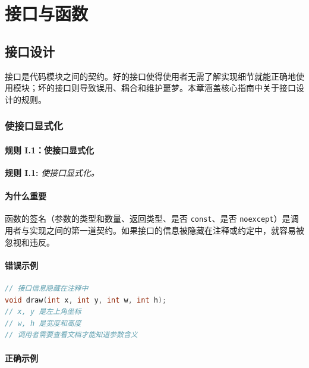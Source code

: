 
\part{接口与函数}

\chapter{接口设计}

接口是代码模块之间的契约。好的接口使得使用者无需了解实现细节就能正确地使用模块；坏的接口则导致误用、耦合和维护噩梦。本章涵盖核心指南中关于接口设计的规则。

\section{使接口显式化}

\subsection{规则 I.1：使接口显式化}

\textbf{规则 I.1:} \textit{使接口显式化。}

\subsection{为什么重要}

函数的签名（参数的类型和数量、返回类型、是否 \texttt{const}、是否 \texttt{noexcept}）是调用者与实现之间的第一道契约。如果接口的信息被隐藏在注释或约定中，就容易被忽视和违反。

\subsection{错误示例}

\begin{lstlisting}[language=C++]
// 接口信息隐藏在注释中
void draw(int x, int y, int w, int h);
// x, y 是左上角坐标
// w, h 是宽度和高度
// 调用者需要查看文档才能知道参数含义
\end{lstlisting}

\subsection{正确示例}

